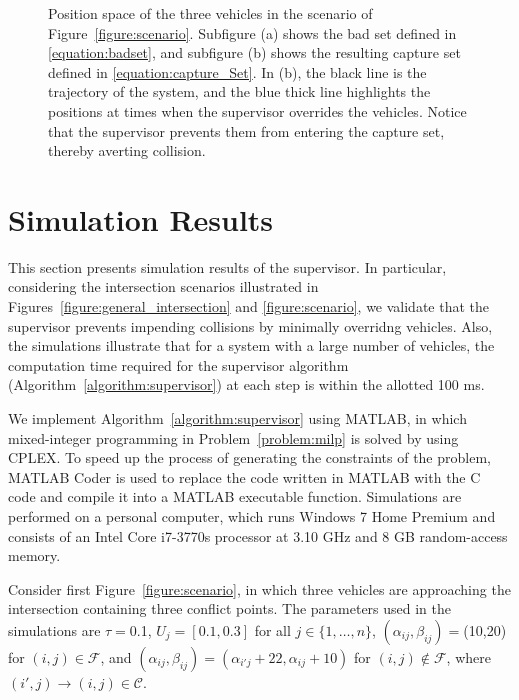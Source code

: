 \documentclass{sig-alternate}
\begin{document}
	\begin{figure*}[htb!]
	\centering
	\quad
	
	\caption{Position space of the three vehicles in the scenario of Figure~\ref{figure:scenario}. Subfigure (a) shows the bad set defined in \eqref{equation:badset}, and subfigure (b) shows the resulting capture set defined in \eqref{equation:capture_Set}. In (b), the black line is the trajectory of the system, and the blue thick line highlights the positions at times when the supervisor overrides the vehicles. Notice that the supervisor prevents them from entering the capture set, thereby averting collision.}
	\label{figure:3D}
	\end{figure*}


\section{Simulation Results}\label{section:simulation_results}
This section presents simulation results of the supervisor. In particular, considering the intersection scenarios illustrated in Figures~\ref{figure:general_intersection} and \ref{figure:scenario}, we validate that the supervisor prevents impending collisions by minimally overridng vehicles. Also, the simulations illustrate that for a system with a large number of vehicles, the computation time required for the supervisor algorithm (Algorithm~\ref{algorithm:supervisor}) at each step is within the allotted 100 ms.

 We implement Algorithm~\ref{algorithm:supervisor} using MATLAB, in which mixed-integer programming in Problem~\ref{problem:milp} is solved by using CPLEX. To speed up the process of generating the constraints of the problem, MATLAB Coder\texttrademark \cite{Matlab_coder_2015} is used to replace the code written in MATLAB with the C code and compile it into a MATLAB executable function. Simulations are performed on a personal computer, which runs Windows 7 Home Premium and consists of an Intel Core i7-3770s processor at 3.10 GHz and 8 GB random-access memory.

Consider first Figure~\ref{figure:scenario}, in which three vehicles are approaching the intersection containing three conflict points. The parameters used in the simulations are $\tau=$0.1, $U_j=[0.1,0.3]$ for all $j\in\{1,\ldots,n\}$, $(\alpha_{ij},\beta_{ij})=$(10,20) for $(i,j)\in\mathcal{F}$, and $(\alpha_{ij}, \beta_{ij})=(\alpha_{i'j} + 22,\alpha_{ij} + 10)$ for $(i,j)\notin\mathcal{F}$, where $(i',j)\rightarrow(i,j)\in\mathcal{C}$. 
\end{document}
